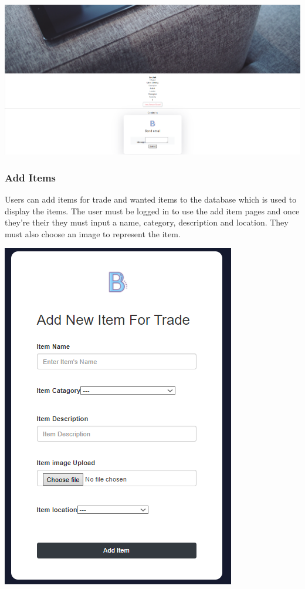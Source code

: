 \includegraphics[width=\textwidth]{img/fe_itemcontact.PNG}
\subsubsection{Add Items}
Users can add items for trade and wanted items to the database which is used to display the items. The user must be logged in to use the add item pages and once they're their they must input a name, category, description and location. They must also choose an image to represent the item.
\par
\includegraphics[scale=.6]{img/fe_additem.PNG}
